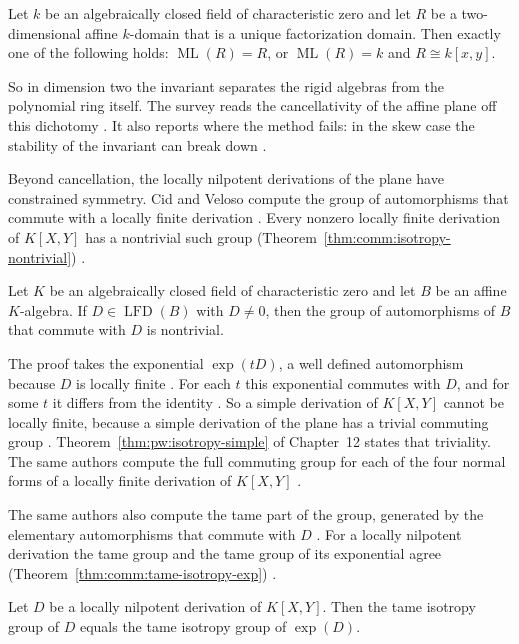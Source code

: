 \begin{theorem}\label{thm:comm:ml-dichotomy}
Let $k$ be an algebraically closed field of characteristic zero and let $R$
be a two-dimensional affine $k$-domain that is a unique factorization
domain. Then exactly one of the following holds: $\operatorname{ML}(R) = R$,
or $\operatorname{ML}(R) = k$ and $R \cong k[x,y]$.
\end{theorem}

So in dimension two the invariant separates the rigid algebras from the
polynomial ring itself. The survey reads the cancellativity of the affine
plane off this dichotomy \cite[Theorem~2.3, p.~7]{VenegasVenegas2025Cancellation}.
It also reports where the method fails: in the skew case the stability of the
invariant can break down
\cite[pp.~2--3]{VenegasVenegas2025Cancellation}.

Beyond cancellation, the locally nilpotent derivations of the plane have
constrained symmetry. Cid and Veloso compute the group of automorphisms that
commute with a locally finite derivation \cite[p.~1]{CidVeloso2026Isotropy}.
Every nonzero locally finite derivation of $K[X,Y]$ has a nontrivial such
group (Theorem~\ref{thm:comm:isotropy-nontrivial}) \cite[Proposition~3.1, p.~3]{CidVeloso2026Isotropy}.

\begin{theorem}\label{thm:comm:isotropy-nontrivial}
Let $K$ be an algebraically closed field of characteristic zero and let $B$
be an affine $K$-algebra. If $D \in \operatorname{LFD}(B)$ with $D \neq 0$,
then the group of automorphisms of $B$ that commute with $D$ is nontrivial.
\end{theorem}

The proof takes the exponential $\exp(tD)$, a well defined automorphism
because $D$ is locally finite
\cite[p.~4]{CidVeloso2026Isotropy}. For each $t$ this exponential commutes
with $D$, and for some $t$ it differs from the identity
\cite[p.~4]{CidVeloso2026Isotropy}. So a simple derivation of $K[X,Y]$ cannot
be locally finite, because a simple derivation of the plane has a trivial
commuting group \cite[p.~4]{CidVeloso2026Isotropy}. Theorem~\ref{thm:pw:isotropy-simple}
of Chapter~12 states that triviality. The same authors compute the full
commuting group for each of the four normal forms of a locally finite
derivation of $K[X,Y]$ \cite[Theorems~3.3--3.9, pp.~4--8]{CidVeloso2026Isotropy}.

The same authors also compute the tame part of the group, generated by the
elementary automorphisms that commute with $D$
\cite[p.~1]{CidVeloso2026TameIsotropy}. For a locally nilpotent derivation the tame
group and the tame group of its exponential agree (Theorem~\ref{thm:comm:tame-isotropy-exp})
\cite[Proposition~4.1, p.~9]{CidVeloso2026TameIsotropy}.\begin{theorem}\label{thm:comm:tame-isotropy-exp}
Let $D$ be a locally nilpotent derivation of $K[X,Y]$. Then the tame
isotropy group of $D$ equals the tame isotropy group of
$\exp(D)$.
\end{theorem}

